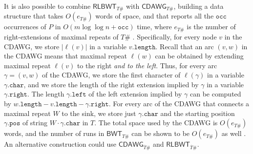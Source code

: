 \documentclass[a4paper,UKenglish]{lipics-v2016}
\newcommand{\REV}[1]{\ensuremath{\overline{#1}}}
\newcommand{\RLBWT}{\ensuremath{\mathsf{RLBWT}}}
\newcommand{\BWT}{\ensuremath{\mathsf{BWT}}}
\newcommand{\CDAWG}{\ensuremath{\mathsf{CDAWG}}}
\begin{document}
It is also possible to combine $\RLBWT_{T\#}$ with $\CDAWG_{T\#}$, building a data structure that takes $O(e_{T\#})$ words of space, and that reports all the $\mathtt{occ}$ occurrences of $P$ in $O(m\log{\log{n}} + \mathtt{occ})$ time, where $e_{T\#}$ is the number of right-extensions of maximal repeats of $T\#$ \cite{belazzougui2015composite}. Specifically, for every node $v$ in the CDAWG, we store $|\ell(v)|$ in a variable $v.\mathtt{length}$. Recall that an arc $(v,w)$ in the CDAWG means that maximal repeat $\ell(w)$ can be obtained by extending maximal repeat $\ell(v)$ to the right \emph{and to the left}. Thus, for every arc $\gamma=(v,w)$ of the CDAWG, we store the first character of $\ell(\gamma)$ in a variable $\gamma.\mathtt{char}$, and we store the length of the right extension implied by $\gamma$ in a variable $\gamma.\mathtt{right}$. The length $\gamma.\mathtt{left}$ of the left extension implied by $\gamma$ can be computed by $w.\mathtt{length}-v.\mathtt{length}-\gamma.\mathtt{right}$. For every arc of the CDAWG that connects a maximal repeat $W$ to the sink, we store just $\gamma.\mathtt{char}$ and the starting position $\gamma.\mathtt{pos}$ of string $W \cdot \gamma.\mathtt{char}$ in $T$. The total space used by the CDAWG is $O(e_{T\#})$ words, and the number of runs in $\BWT_{T\#}$ can be shown to be $O(e_{T\#})$ as well \cite{belazzougui2015composite}. An alternative construction could use $\CDAWG_{\REV{T}\#}$ and $\RLBWT_{\REV{T}\#}$.
\end{document}
